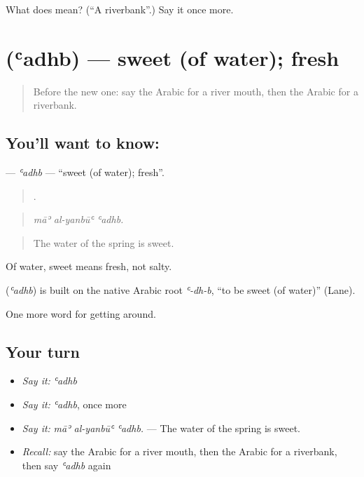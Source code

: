 \begin{tcolorbox}[breakable,colback=teal!4,colframe=teal!35!black,title={Before you move on}]
What does  mean? (\textquotedblleft{}A riverbank\textquotedblright{}.) Say it once more.
\end{tcolorbox}
\section[\texorpdfstring{\ar{عذب} (ʿadhb)}{عذب (ʿadhb)}]{ (ʿadhb) — sweet (of water); fresh}

\label{lesson:AR-C470-adhb}



\begin{quote}
Before the new one: say the Arabic for a river mouth, then the Arabic for a riverbank.
\end{quote}

\subsection*{You'll want to know: }
\textbf{} — \emph{ʿadhb} — \textquotedblleft{}sweet (of water); fresh\textquotedblright{}.

\begin{quote}
  .
\end{quote}

\begin{quote}
\emph{māʾ al-yanbūʿ ʿadhb.}
\end{quote}

\begin{quote}
The water of the spring is sweet.
\end{quote}

Of water, sweet means fresh, not salty.

\begin{cousinweb}
\textbf{} (\emph{ʿadhb}) is built on the native Arabic root \emph{ʿ-dh-b}, \textquotedblleft{}to be sweet (of water)\textquotedblright{} (Lane).
\end{cousinweb}

\begin{grammarlens}[title={What you've built}]
One more word for getting around.
\end{grammarlens}

\subsection*{Your turn}
\begin{itemize}
\raggedright
  \item \emph{Say it:} \emph{ʿadhb}
  \item \emph{Say it:} \emph{ʿadhb}, once more
  \item \emph{Say it:} \emph{māʾ al-yanbūʿ ʿadhb.} — The water of the spring is sweet.
  \item \emph{Recall:} say the Arabic for a river mouth, then the Arabic for a riverbank, then say \emph{ʿadhb} again
\end{itemize}

